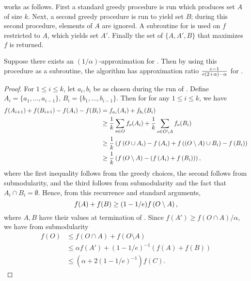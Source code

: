 \iter works as follows. First a standard greedy procedure is run
which produces set $A$ of size $k$.
Next, a second greedy procedure is run to yield set $B$; during
this second procedure, elements of $A$ are ignored.
A subroutine for \unc is used on $f$ restricted to $A$, which
yields set $A'$. Finally the set of $\{A, A', B \}$ that maximizes
$f$ is returned. 
\begin{theorem}
  Suppose there exists an $(1/\alpha)$-approximation for
  \unc. Then by using this procedure as a subroutine,
  the algorithm \iter has approximation ratio
  $\frac{e - 1}{e(2 + \alpha) - \alpha}$ for \sm.
\end{theorem}
\begin{proof}
  For $1 \le i \le k$, let $a_i,b_i$ be as chosen during the
  run of \iter. Define $A_i = \{ a_1, \ldots, a_{i - 1} \}$,
  $B_i = \{ b_1, \ldots, b_{i - 1} \}$. Then for 
  for any $1 \le i \le k$, we have
  \begin{align*}
    f(A_{i + 1}) + f(B_{i + 1}) - f(A_i) - f(B_i) &= f_{a_i}(A_i) + f_{b_i}( B_i ) \\
 &\ge \frac{1}{k} \sum_{o \in O} f_o( A_i ) + \frac{1}{k} \sum_{o \in O \setminus A} f_o (B_i ) \\
    &\ge \frac{1}{k} \left( f \left( O \cup A_i \right) - f \left( A_i \right) + f \left(  (O \setminus A) \cup B_i  \right) - f \left(  B_i  \right)\right) \\
    &\ge \frac{1}{k} \left( f \left(  O \setminus A  \right) - (f \left( A_i \right) + f \left( B_i \right)) \right),
  \end{align*}
  where the first inequality follows from the greedy choices,
  the second follows from submodularity,
  and the third follows from submodularity and the fact that $A_i \cap B_i = \emptyset$.
  Hence, from this recurrence and standard arguments, 
  $$f(A) + f(B) \ge (1 - 1/e) f \left( O \setminus A \right),$$
  where $A,B$ have their values at termination of \iter.
  Since $f(A') \ge f(O \cap A) / \alpha$, 
  we have from submodularity
  \begin{align*}
    f(O) &\le f( O \cap A ) + f(O \setminus A) \\
    &\le \alpha f(A') + (1-1/e)^{-1}(f(A) + f(B)) \\
    &\le ( \alpha + 2(1-1/e)^{-1} ) f(C).
  \end{align*}
\end{proof}